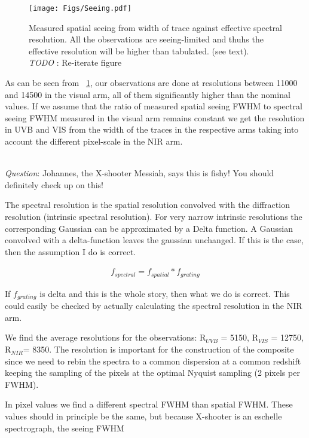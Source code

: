 \documentclass{aa}    %
\newcommand{\figref}[1]{\ref{fig:#1}}
\newcommand{\Fig}[1]{\figurename~\figref{#1}}
\newcommand{\fig}[1]{\Fig{#1}}
\newcommand{\figlabel}[1]{\label{fig:#1}}
\newcommand{\todo}[3]{{\color{#2}\emph{#1}: #3}}
\newcommand{\jstodo}[1]{\todo{ \\TODO }{red}{#1}}
\newcommand{\qtodo}[1]{\todo{\\ Question}{red}{#1}}
\begin{document}
\begin{figure}[hbtp]
  \centering
  \texttt{[image: Figs/Seeing.pdf]}
  \caption[]{Measured spatial seeing from width of trace against effective spectral resolution. All the observations are seeing-limited and thuhs the effective resolution will be higher than tabulated. (see text). \jstodo{Re-iterate figure} }
\figlabel{seeing}
\end{figure}



As can be seen from \fig{seeing}, our observations are done at resolutions between 11000 and 14500 in the visual arm, all of them significantly higher than the nominal values. If we assume that the ratio of measured spatial seeing FWHM to spectral seeing FWHM measured in the visual arm remains constant we get the resolution in UVB and VIS from the width of the traces in the respective arms taking into account the different pixel-scale in the NIR arm. 

\qtodo{Johannes, the X-shooter Messiah, says this is fishy! You should definitely check up on this!}

The spectral resolution is the spatial resolution convolved with the diffraction resolution (intrinsic spectral resolution). For very narrow intrinsic resolutions the corresponding Gaussian can be approximated by a Delta function. A Gaussian convolved with a delta-function leaves the gaussian unchanged. If this is the case, then the assumption I do is correct. 

\begin{eqnarray}
f_{spectral} = f_{spatial} \ast f_{grating}
\end{eqnarray}

If $f_{grating}$ is delta and this is the whole story, then what we do is correct. This could easily be checked by actually calculating the spectral resolution in the NIR arm.  


We find the average resolutions for the observations: R$_{UVB}$ = 5150, R$_{VIS}$ = 12750, R$_{NIR}$= 8350. The resolution is important for the construction of the composite since we need to rebin the spectra to a common dispersion at a common redshift keeping the sampling of the pixels at the optimal Nyquist sampling (2 pixels per FWHM). 

In pixel values we find a different spectral FWHM than spatial FWHM. These values should in principle be the same, but because X-shooter is an eschelle spectrograph, the seeing FWHM
\end{document}
